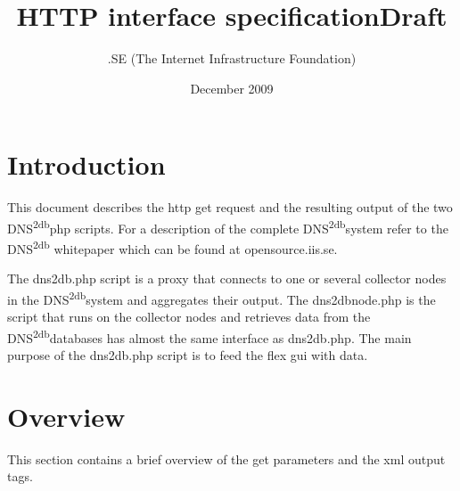 \documentclass[a4paper]{article}
\title{\dnsdb \linebreak\linebreak HTTP interface specification\linebreak \textbf{Draft} }
\author{\linebreak.SE (The Internet Infrastructure Foundation)}
\date{December 2009}
\newcommand{\dnsdb}{DNS\textsuperscript{2db}}
\begin{document}
\maketitle
\newpage

\tableofcontents
\newpage

\section{Introduction}
This document describes the http get request and the resulting output of 
the two \dnsdb \hspace{3pt}php scripts. For a description of the complete \dnsdb \hspace{3pt}system refer to the \dnsdb 
whitepaper which can be found at opensource.iis.se.

The dns2db.php script is a proxy that connects to one or several collector 
nodes in the \dnsdb  system and aggregates their output. 
The dns2dbnode.php is the script that runs on the collector nodes and retrieves data 
from the \dnsdb databases has almost the same interface as dns2db.php. 
The main purpose of the dns2db.php script is to feed the flex gui with data.


\section{Overview}

This section contains a brief overview of the get parameters and the 
xml output tags.
\end{document}
